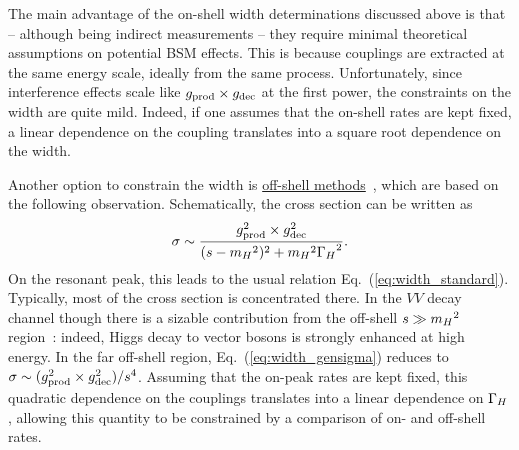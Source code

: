 The main advantage of the on-shell width determinations discussed above is that -- although
being indirect measurements -- they require minimal theoretical assumptions on potential
BSM effects. This is because couplings are extracted at the same energy scale, ideally
from the same process. Unfortunately, since interference effects scale like 
$g_{\rm prod}\times g_{\rm dec}$ at the first power, the constraints on the width are quite mild.
Indeed, if one assumes that the on-shell rates are kept fixed, a linear dependence on the coupling 
translates into a square root dependence on the width. 

Another option to constrain the width is 
\underline{off-shell methods}~\cite{Kauer:2012hd,Caola:2013yja,Campbell:2013una,Campbell:2013wga}, 
which are based on the following observation.
Schematically, the cross section can be written as
\begin{equation}
\sigma \sim \frac{g_{\rm prod}^2 \times g_{\rm dec}^2}{(s-{m_H}^2)^2 + {m_H}^2 {\Gamma_H}^2}.
\label{eq:width_gensigma}
\end{equation}
On the resonant peak, this leads to the usual relation Eq.~(\ref{eq:width_standard}). Typically,
most of the cross section is concentrated there. In the $VV$ decay channel though there is a sizable
contribution from the off-shell $s \gg {m_H}^2$ region~\cite{Kauer:2012hd}: 
indeed, Higgs decay to vector bosons is 
strongly enhanced at high energy. In the far
off-shell region, Eq.~(\ref{eq:width_gensigma}) reduces to 
$\sigma\sim (g_{\rm prod}^2\times g_{\rm dec}^2)/s^4$. Assuming that the on-peak rates are kept
fixed, this quadratic dependence on the couplings translates into a linear dependence on ${\Gamma_H}$, allowing this quantity
to be constrained by a comparison of on- and off-shell rates. 


